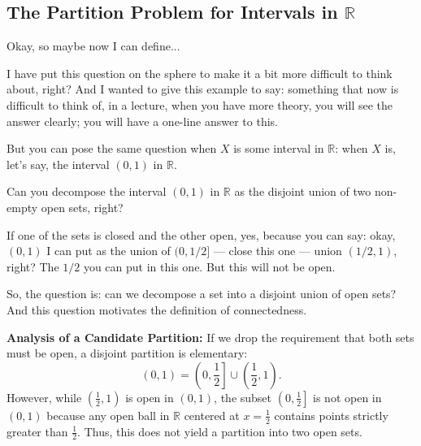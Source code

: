 \begin{hidden}
\end{hidden}

\subsection{The Partition Problem for Intervals in \texorpdfstring{$\mathbb{R}$}{R}}

\begin{speech}[01:19:58 - 01:21:49]
Okay, so maybe now I can define...

I have put this question on the sphere to make it a bit more difficult to think about, right? And I wanted to give this example to say: something that now is difficult to think of, in a lecture, when you have more theory, you will see the answer clearly; you will have a one-line answer to this.

But you can pose the same question when $X$ is some interval in $\mathbb{R}$:  when $X$ is, let's say, the interval $(0, 1)$ in $\mathbb{R}$.

Can you decompose the interval $(0, 1)$ in $\mathbb{R}$ as the disjoint union of two non-empty open sets, right?

If one of the sets is closed and the other open, yes, because you can say: okay, $(0, 1)$ I can put as the union of $(0, 1/2]$ --- close this one --- union $(1/2, 1)$, right? \inlinemetanote{writes '$(0, 1) = (0, 1/2] \cup (1/2, 1)$'} The $1/2$ you can put in this one. But this will not be open.

So, the question is: can we decompose a set into a disjoint union of open sets? And this question motivates the definition of connectedness.
\end{speech}

\begin{content}

\textbf{Analysis of a Candidate Partition:}
If we drop the requirement that both sets must be open, a disjoint partition is elementary:
\[
(0, 1) = \left( 0, \frac{1}{2} \right] \cup \left( \frac{1}{2}, 1 \right).
\]
However, while $\left(\frac{1}{2}, 1\right)$ is open in $(0, 1)$, the subset $\left(0, \frac{1}{2}\right]$ is not open in $(0, 1)$ because any open ball in $\mathbb{R}$ centered at $x = \frac{1}{2}$ contains points strictly greater than $\frac{1}{2}$. Thus, this does not yield a partition into two open sets.
\end{content}

